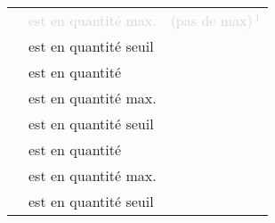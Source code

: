 \documentclass[a4paper,10pt]{article}
\begin{document}
\begin{center}
\begin{tabu}{lll}
    \textcolor{lightgray}{} & \textcolor{lightgray}{est en quantité max.} & \textcolor{lightgray}{(pas de max)\,$^1$} \\
     & est en quantité seuil &  \\
     & est en quantité &  \\
     & est en quantité max. &  \\
     & est en quantité seuil &  \\
     & est en quantité &  \\
     & est en quantité max. &  \\
     & est en quantité seuil &  \\
\end{tabu}
\end{center}
\end{document}
